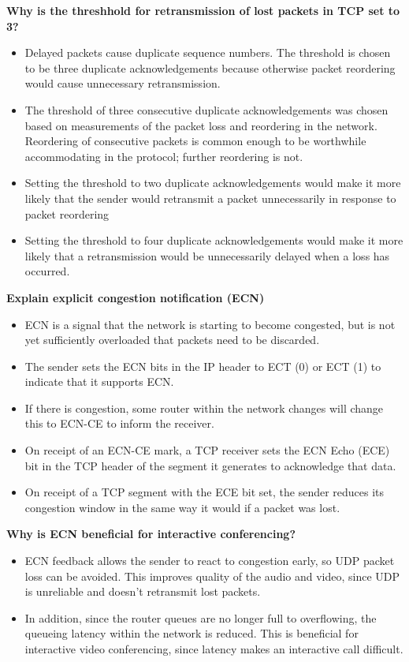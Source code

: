 \documentclass{article}
\begin{document}
\textbf{Why is the threshhold for retransmission of lost packets in TCP set to 3?}
\begin{itemize}
    \item Delayed packets cause duplicate sequence numbers. The threshold
    is chosen to be three duplicate acknowledgements because otherwise packet reordering
    would cause unnecessary retransmission.
    \item The threshold of three consecutive duplicate acknowledgements was chosen based on
    measurements of the packet loss and reordering in the network. Reordering
    of consecutive packets is common enough to be worthwhile accommodating in the
    protocol; further reordering is not.
    \item Setting the threshold to two duplicate acknowledgements would make it more likely
    that the sender would retransmit a packet unnecessarily in response to packet reordering
    \item Setting the threshold to four duplicate acknowledgements would make it more likely that
    a retransmission would be unnecessarily delayed when a loss has occurred.
\end{itemize}


\textbf{Explain explicit congestion notification (ECN)}
\begin{itemize}
    \item ECN is a signal that the network is starting to become congested, but is not
    yet sufficiently overloaded that packets need to be discarded.
    \item The sender sets the ECN bits in the IP header to ECT (0) or ECT (1) to indicate that it
    supports ECN\@.
    \item If there is congestion, some router within the network changes
    will change this to ECN-CE to inform the receiver.
    \item On receipt of an ECN-CE mark, a TCP receiver sets the ECN Echo (ECE) bit in the
    TCP header of the segment it generates to acknowledge that data.
    \item On receipt of a TCP segment with the ECE bit set, the sender reduces its congestion
    window in the same way it would if a packet was lost.
\end{itemize}


\textbf{Why is ECN beneficial for interactive conferencing?}
\begin{itemize}
    \item ECN feedback allows the sender to react to congestion early, so UDP packet
    loss can be avoided. This improves quality of the audio and video, since UDP
    is unreliable and doesn't retransmit lost packets.
    \item In addition, since the router queues are no longer full to overflowing, the queueing
    latency within the network is reduced. This is beneficial for interactive video
    conferencing, since latency makes an interactive call difficult.
\end{itemize}
\end{document}
